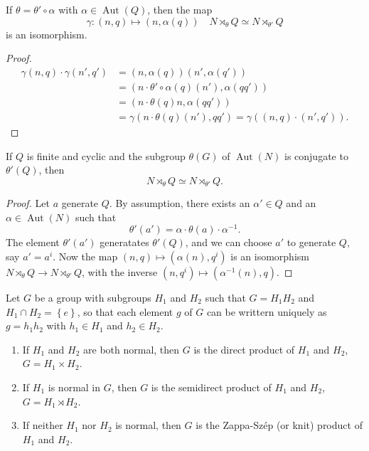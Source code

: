 \begin{lemma}
  If \( \theta = \theta' \circ \alpha \) with \( \alpha \in \operatorname{Aut}(Q) \), then the map
  \[
    \gamma: (n, q) \mapsto (n, \alpha(q))\quad N \rtimes_\theta Q \simeq N \rtimes_{\theta'}Q
  \]
  is an isomorphism.
\end{lemma}
\begin{proof}
  \begin{align*}
    \gamma(n, q) \cdot \gamma(n', q') &= (n, \alpha(q))(n', \alpha(q'))\\
                                      &= (n \cdot \theta'\circ\alpha(q)(n'), \alpha(qq'))\\
                                      &= (n \cdot \theta(q)n, \alpha(qq'))\\
                                      &= \gamma(n \cdot \theta(q)(n'), qq') = \gamma((n, q)\cdot(n', q')).
  \end{align*}
\end{proof}

\begin{lemma}
  If \( Q \) is finite and cyclic and the subgroup \( \theta(G) \) of \( \operatorname{Aut}(N) \) is conjugate to \( \theta'(Q) \), then
  \[
    N \rtimes_\theta Q \simeq N \rtimes_{\theta'}  Q.
  \]
\end{lemma}
\begin{proof}
  Let \( a \) generate \( Q \).
  By assumption, there exists an \( \alpha' \in Q \) and an \( \alpha \in \operatorname{Aut}(N) \) such that
  \[
    \theta'(a') = \alpha \cdot \theta(a) \cdot \alpha^{-1}.
  \]
  The element \( \theta'(a') \) generatates \( \theta'(Q) \), and we can choose \( a' \) to generate \( Q \), say \( a' = a^i \).
  Now the map \( (n, q) \mapsto (\alpha(n), q^i) \) is an isomorphism \( N \rtimes_\theta Q \to N \rtimes_{\theta'} Q \), with the inverse \( (n, q^i) \mapsto (\alpha^{-1}(n), q) \).
\end{proof}

\begin{theorem}
  Let \( G \) be a group with subgroups \( H_1 \) and \( H_2 \) such that \( G = H_1 H_2 \) and \( H_1 \cap H_2 = \left\lbrace e \right\rbrace \), so that each element \( g \) of \( G \) can be writtern uniquely as \( g = h_1 h_2 \) with \( h_1 \in H_1 \) and \( h_2 \in H_2 \).
  \begin{enumerate}
    \item If \( H_1 \) and \( H_2 \) are both normal, then \( G \) is the direct product of \( H_1 \) and \( H_2 \), \( G = H_1 \times H_2 \).
    \item If \( H_1 \) is normal in \( G \), then \( G \) is the semidirect product of \( H_1 \) and \( H_2 \), \( G = H_1 \rtimes H_2 \).
    \item If neither \( H_1 \) nor \( H_2 \) is normal, then \( G \) is the Zappa-Sz\'{e}p (or knit) product of \( H_1 \) and \( H_2 \).
  \end{enumerate}
\end{theorem}

